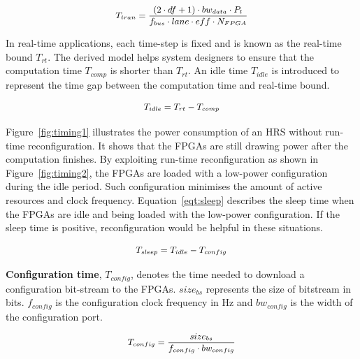 \begin{equation}
\small
\begin{aligned}
T_{tran} = \frac{(2 \cdot df + 1) \cdot bw_{data} \cdot P_t}{f_{bus} \cdot lane \cdot eff \cdot N_{FPGA}}
\end{aligned}
\label{eqt:data}
\end{equation}

In real-time applications, each time-step is fixed and is known as the real-time bound $T_{rt}$.
The derived model helps system designers to ensure that the computation time $T_{comp}$ is shorter than $T_{rt}$.
An idle time $T_{idle}$ is introduced to represent the time gap between the computation time and real-time bound.

\begin{equation}
\small
\begin{aligned}
T_{idle} = T_{rt} - T_{comp}
\end{aligned}
\label{eqt:idle}
\end{equation}

Figure~\ref{fig:timing1} illustrates the power consumption of an HRS without run-time reconfiguration.
It shows that the FPGAs are still drawing power after the computation finishes.
By exploiting run-time reconfiguration as shown in Figure~\ref{fig:timing2}, the FPGAs are loaded with a low-power configuration during the idle period.
Such configuration minimises the amount of active resources and clock frequency.
Equation~\ref{eqt:sleep} describes the sleep time when the FPGAs are idle and being loaded with the low-power configuration.
If the sleep time is positive, reconfiguration would be helpful in these situations.

\begin{equation}
\small
\begin{aligned}
T_{sleep} = T_{idle} - T_{config}
\end{aligned}
\label{eqt:sleep}
\end{equation}

\textbf{Configuration time}, $T_{config}$, denotes the time needed to download a configuration bit-stream to the FPGAs.
$size_{bs}$ represents the size of bitstream in bits.
$f_{config}$ is the configuration clock frequency in Hz and $bw_{config}$ is the width of the configuration port.

\begin{equation}
\small
\begin{aligned}
T_{config} = \frac{size_{bs}}{f_{config} \cdot bw_{config}}
\end{aligned}
\label{eqt:cf}
\end{equation}

